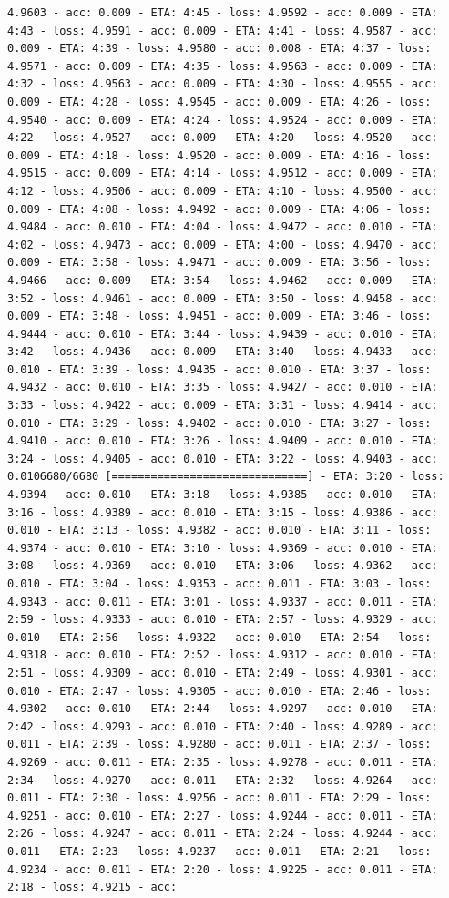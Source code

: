 \documentclass[11pt]{article}
\begin{document}
\begin{Verbatim}[commandchars=\\\{\}]
4.9603 - acc: 0.009 - ETA: 4:45 - loss: 4.9592 - acc: 0.009 - ETA: 4:43 - loss: 4.9591 - acc: 0.009 - ETA: 4:41 - loss: 4.9587 - acc: 0.009 - ETA: 4:39 - loss: 4.9580 - acc: 0.008 - ETA: 4:37 - loss: 4.9571 - acc: 0.009 - ETA: 4:35 - loss: 4.9563 - acc: 0.009 - ETA: 4:32 - loss: 4.9563 - acc: 0.009 - ETA: 4:30 - loss: 4.9555 - acc: 0.009 - ETA: 4:28 - loss: 4.9545 - acc: 0.009 - ETA: 4:26 - loss: 4.9540 - acc: 0.009 - ETA: 4:24 - loss: 4.9524 - acc: 0.009 - ETA: 4:22 - loss: 4.9527 - acc: 0.009 - ETA: 4:20 - loss: 4.9520 - acc: 0.009 - ETA: 4:18 - loss: 4.9520 - acc: 0.009 - ETA: 4:16 - loss: 4.9515 - acc: 0.009 - ETA: 4:14 - loss: 4.9512 - acc: 0.009 - ETA: 4:12 - loss: 4.9506 - acc: 0.009 - ETA: 4:10 - loss: 4.9500 - acc: 0.009 - ETA: 4:08 - loss: 4.9492 - acc: 0.009 - ETA: 4:06 - loss: 4.9484 - acc: 0.010 - ETA: 4:04 - loss: 4.9472 - acc: 0.010 - ETA: 4:02 - loss: 4.9473 - acc: 0.009 - ETA: 4:00 - loss: 4.9470 - acc: 0.009 - ETA: 3:58 - loss: 4.9471 - acc: 0.009 - ETA: 3:56 - loss: 4.9466 - acc: 0.009 - ETA: 3:54 - loss: 4.9462 - acc: 0.009 - ETA: 3:52 - loss: 4.9461 - acc: 0.009 - ETA: 3:50 - loss: 4.9458 - acc: 0.009 - ETA: 3:48 - loss: 4.9451 - acc: 0.009 - ETA: 3:46 - loss: 4.9444 - acc: 0.010 - ETA: 3:44 - loss: 4.9439 - acc: 0.010 - ETA: 3:42 - loss: 4.9436 - acc: 0.009 - ETA: 3:40 - loss: 4.9433 - acc: 0.010 - ETA: 3:39 - loss: 4.9435 - acc: 0.010 - ETA: 3:37 - loss: 4.9432 - acc: 0.010 - ETA: 3:35 - loss: 4.9427 - acc: 0.010 - ETA: 3:33 - loss: 4.9422 - acc: 0.009 - ETA: 3:31 - loss: 4.9414 - acc: 0.010 - ETA: 3:29 - loss: 4.9402 - acc: 0.010 - ETA: 3:27 - loss: 4.9410 - acc: 0.010 - ETA: 3:26 - loss: 4.9409 - acc: 0.010 - ETA: 3:24 - loss: 4.9405 - acc: 0.010 - ETA: 3:22 - loss: 4.9403 - acc: 0.0106680/6680 [==============================] - ETA: 3:20 - loss: 4.9394 - acc: 0.010 - ETA: 3:18 - loss: 4.9385 - acc: 0.010 - ETA: 3:16 - loss: 4.9389 - acc: 0.010 - ETA: 3:15 - loss: 4.9386 - acc: 0.010 - ETA: 3:13 - loss: 4.9382 - acc: 0.010 - ETA: 3:11 - loss: 4.9374 - acc: 0.010 - ETA: 3:10 - loss: 4.9369 - acc: 0.010 - ETA: 3:08 - loss: 4.9369 - acc: 0.010 - ETA: 3:06 - loss: 4.9362 - acc: 0.010 - ETA: 3:04 - loss: 4.9353 - acc: 0.011 - ETA: 3:03 - loss: 4.9343 - acc: 0.011 - ETA: 3:01 - loss: 4.9337 - acc: 0.011 - ETA: 2:59 - loss: 4.9333 - acc: 0.010 - ETA: 2:57 - loss: 4.9329 - acc: 0.010 - ETA: 2:56 - loss: 4.9322 - acc: 0.010 - ETA: 2:54 - loss: 4.9318 - acc: 0.010 - ETA: 2:52 - loss: 4.9312 - acc: 0.010 - ETA: 2:51 - loss: 4.9309 - acc: 0.010 - ETA: 2:49 - loss: 4.9301 - acc: 0.010 - ETA: 2:47 - loss: 4.9305 - acc: 0.010 - ETA: 2:46 - loss: 4.9302 - acc: 0.010 - ETA: 2:44 - loss: 4.9297 - acc: 0.010 - ETA: 2:42 - loss: 4.9293 - acc: 0.010 - ETA: 2:40 - loss: 4.9289 - acc: 0.011 - ETA: 2:39 - loss: 4.9280 - acc: 0.011 - ETA: 2:37 - loss: 4.9269 - acc: 0.011 - ETA: 2:35 - loss: 4.9278 - acc: 0.011 - ETA: 2:34 - loss: 4.9270 - acc: 0.011 - ETA: 2:32 - loss: 4.9264 - acc: 0.011 - ETA: 2:30 - loss: 4.9256 - acc: 0.011 - ETA: 2:29 - loss: 4.9251 - acc: 0.010 - ETA: 2:27 - loss: 4.9244 - acc: 0.011 - ETA: 2:26 - loss: 4.9247 - acc: 0.011 - ETA: 2:24 - loss: 4.9244 - acc: 0.011 - ETA: 2:23 - loss: 4.9237 - acc: 0.011 - ETA: 2:21 - loss: 4.9234 - acc: 0.011 - ETA: 2:20 - loss: 4.9225 - acc: 0.011 - ETA: 2:18 - loss: 4.9215 - acc: 
\end{Verbatim}
\end{document}
